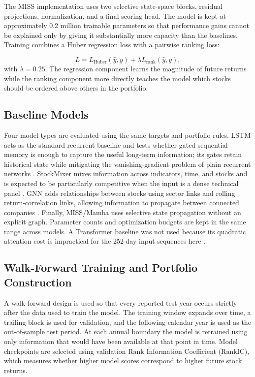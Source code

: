 \documentclass[12pt]{article}
\begin{document}
The MISS implementation uses two selective state-space blocks, residual projections, normalization, and a final scoring head. The model is kept at approximately 0.2 million trainable parameters so that performance gains cannot be explained only by giving it substantially more capacity than the baselines. Training combines a Huber regression loss with a pairwise ranking loss:

\begin{equation}
L = L_{\mathrm{Huber}}(\hat{y}, y) + \lambda L_{\mathrm{rank}}(\hat{y}, y),
\end{equation}
with $\lambda = 0.25$. The regression component learns the magnitude of future returns while the ranking component more directly teaches the model which stocks should be ordered above others in the portfolio.

\subsection{Baseline Models}
Four model types are evaluated using the same targets and portfolio rules. LSTM acts as the standard recurrent baseline and tests whether gated sequential memory is enough to capture the useful long-term information; its gates retain historical state while mitigating the vanishing-gradient problem of plain recurrent networks \cite{hochreiter1997,rumelhart1986}. StockMixer mixes information across indicators, time, and stocks and is expected to be particularly competitive when the input is a dense technical panel \cite{fan2024}. GNN adds relationships between stocks using sector links and rolling return-correlation links, allowing information to propagate between connected companies \cite{feng2019,qian2024}. Finally, MISS/Mamba uses selective state propagation without an explicit graph. Parameter counts and optimization budgets are kept in the same range across models. A Transformer baseline was not used because its quadratic attention cost is impractical for the 252-day input sequences here \cite{vaswani2017}.

\subsection{Walk-Forward Training and Portfolio Construction}
A walk-forward design is used so that every reported test year occurs strictly after the data used to train the model. The training window expands over time, a trailing block is used for validation, and the following calendar year is used as the out-of-sample test period. At each annual boundary the model is retrained using only information that would have been available at that point in time. Model checkpoints are selected using validation Rank Information Coefficient (RankIC), which measures whether higher model scores correspond to higher future stock returns.
\end{document}
